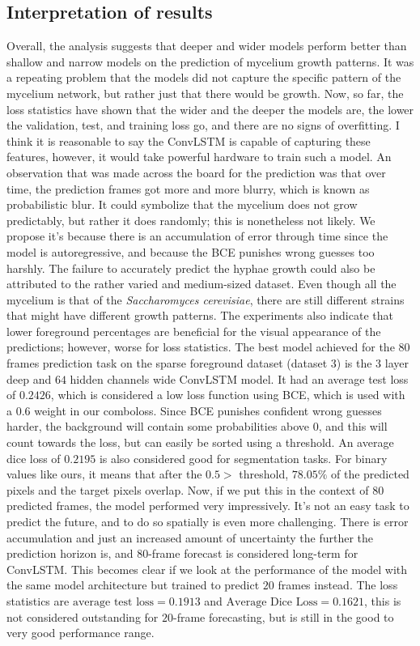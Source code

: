 \documentclass[a4paper,12pt]{article}
\begin{document}
\subsection{Interpretation of results}
Overall, the analysis suggests that deeper and wider models perform better than shallow and narrow models on the prediction of mycelium growth patterns. It was a repeating problem that the models did not capture the specific pattern of the mycelium network, but rather just that there would be growth. Now, so far, the loss statistics have shown that the wider and the deeper the models are, the lower the validation, test, and training loss go, and there are no signs of overfitting. I think it is reasonable to say the ConvLSTM is capable of capturing these features, however, it would take powerful hardware to train such a model.
An observation that was made across the board for the prediction was that over time, the prediction frames got more and more blurry, which is known as probabilistic blur. It could symbolize that the mycelium does not grow predictably, but rather it does randomly; this is nonetheless not likely. We propose it's because there is an accumulation of error through time since the model is autoregressive, and because the BCE punishes wrong guesses too harshly. The failure to accurately predict the hyphae growth could also be attributed to the rather varied and medium-sized dataset.
Even though all the mycelium is that of the \textit{Saccharomyces cerevisiae}, there are still different strains that might have different growth patterns.
The experiments also indicate that lower foreground percentages are beneficial for the visual appearance of the predictions; however, worse for loss statistics.
The best model achieved for the $80$ frames prediction task on the sparse foreground dataset (dataset 3) is the $3$ layer deep and $64$ hidden channels wide ConvLSTM model. It had an average test loss of $0.2426$, which is considered a low loss function using BCE, which is used with a $0.6$ weight in our comboloss. Since BCE punishes confident wrong guesses harder, the background will contain some probabilities above $0$, and this will count towards the loss, but can easily be sorted using a threshold. An average dice loss of $0.2195$ is also considered good for segmentation tasks. For binary values like ours, it means that after the $0.5>$ threshold, $78.05\%$ of the predicted pixels and the target pixels overlap.
Now, if we put this in the context of $80$ predicted frames, the model performed very impressively. It's not an easy task to predict the future, and to do so spatially is even more challenging. There is error accumulation and just an increased amount of uncertainty the further the prediction horizon is, and $80$-frame forecast is considered long-term for ConvLSTM.
This becomes clear if we look at the performance of the model with the same model architecture but trained to predict $20$ frames instead. The loss statistics are $\text{average test loss} = 0.1913$ and $\text{Average Dice Loss} = 0.1621$, this is not considered outstanding for $20$-frame forecasting, but is still in the good to very good performance range.
\end{document}
